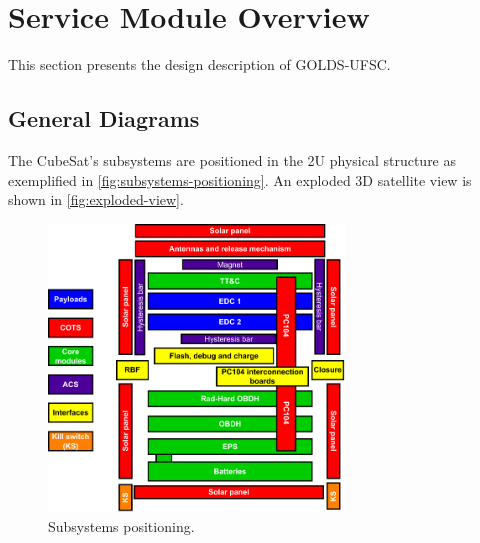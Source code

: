 %
%
%
%
%

%
%
%
%
%
%

\chapter{Service Module Overview} \label{ch:design}

This section presents the design description of GOLDS-UFSC.

\section{General Diagrams}

The CubeSat's subsystems are positioned in the 2U physical structure as exemplified in \autoref{fig:subsystems-positioning}. An exploded 3D satellite view is shown in \autoref{fig:exploded-view}.

\begin{figure}[!htb]
    \begin{center}
        \includegraphics[width=0.7\textwidth]{figures/subsystems-positioning2.pdf}
        \caption{Subsystems positioning.}
        \label{fig:subsystems-positioning}
    \end{center}
\end{figure}

